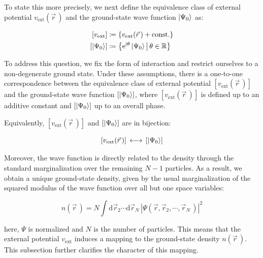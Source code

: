 To state this more precisely, we next define the equivalence class of external potential $v_\mathrm{ext}(\vec{r}\,)$ and the ground-state wave function $\ket{\Psi_0}$ as:

\begin{equation}
\begin{aligned}
    \left[v_\mathrm{ext}\right]&\coloneqq\left\{ v_\mathrm{ext}(\vec{r}\,) +\mathrm{const.}\right\}\\
    \left[\ket{\Psi_0}\right]&\coloneqq\left\{\mathrm{e}^{\mathrm{i}\theta}\ket{\Psi_0} \,\middle|\,\theta\in\mathbb{R}\right\}
\end{aligned}
\label{equivalence_classes_definition}
\end{equation}

To address this question, we fix the form of interaction and restrict ourselves to a non-degenerate ground state.
Under these assumptions, there is a one-to-one correspondence between the equivalence class of external potential $\left[v_\mathrm{ext}(\vec{r}\,)\right]$ and the ground-state wave function $\left[\ket{\Psi_0}\right]$, 
where $\left[v_\mathrm{ext}(\vec{r}\,)\right]$ is defined up to an additive constant and $\left[\ket{\Psi_0}\right]$ up to an overall phase.

Equivalently, $\left[v_\mathrm{ext}(\vec{r}\,)\right]$ and $\left[\ket{\Psi_0}\right]$ are in bijection:

\begin{equation}
    \left[v_\mathrm{ext}(\vec{r}\,)\right]\,\longleftrightarrow\,\left[\ket{\Psi_0}\right]
\label{potential_wave_function_correspondence}
\end{equation}

Moreover, the wave function is directly related to the density through the standard marginalization over the remaining $N-1$ particles. As a result, we obtain a unique ground-state density, given by the usual marginalization of the squared modulus of the wave function over all but one space variables:

\begin{equation}
    n(\vec{r}\,)=N\int \mathrm{d}\vec{r}_2\cdots\mathrm{d}\vec{r}_N\,\left|\Psi(\vec{r},\vec{r}_2,\cdots,\vec{r}_N\,)\right|^2
\label{density_function}
\end{equation}

here, $\Psi$ is normalized and $N$ is the number of particles.
This means that the external potential $v_\mathrm{ext}$ induces a mapping to the ground-state density $n(\vec r\,)$.
This subsection further clarifies the character of this mapping.

